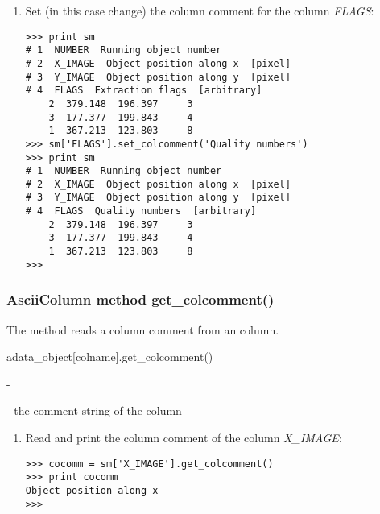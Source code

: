 \begin{enumerate}
\item Set (in this case change) the column comment for the column {\sl FLAGS}:
\begin{small}
\begin{verbatim}
>>> print sm
# 1  NUMBER  Running object number
# 2  X_IMAGE  Object position along x  [pixel]
# 3  Y_IMAGE  Object position along y  [pixel]
# 4  FLAGS  Extraction flags  [arbitrary]
    2  379.148  196.397     3
    3  177.377  199.843     4
    1  367.213  123.803     8
>>> sm['FLAGS'].set_colcomment('Quality numbers')
>>> print sm
# 1  NUMBER  Running object number
# 2  X_IMAGE  Object position along x  [pixel]
# 3  Y_IMAGE  Object position along y  [pixel]
# 4  FLAGS  Quality numbers  [arbitrary]
    2  379.148  196.397     3
    3  177.377  199.843     4
    1  367.213  123.803     8
>>>
\end{verbatim}
\end{small}
\end{enumerate}

\subsubsection{AsciiColumn method get\_colcomment()}
\label{acm_get_colcomment}
The method reads a column comment from an \ad column.

adata\_object[colname].get\_colcomment()

-

- the comment string of the column

\begin{enumerate}
\item Read and print the column comment of the column {\sl X\_IMAGE}:
\begin{small}
\begin{verbatim}
>>> cocomm = sm['X_IMAGE'].get_colcomment()
>>> print cocomm
Object position along x
>>>
\end{verbatim}
\end{small}
\end{enumerate}

